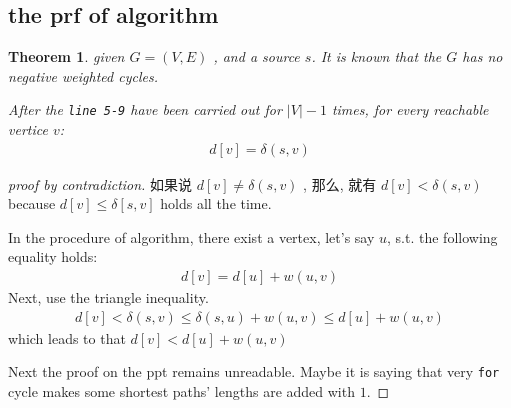\documentclass[a4paper, 10pt]{ctexart} %
\newtheorem{theorem}{Theorem}
\begin{document}
\subsection{the prf of algorithm}
\begin{theorem}
given $G = \left( V, E\right)$ , and a source $s$.
It is known that the $G$ has no 
negative weighted cycles.

After the \verb|line 5-9| have been 
carried out for $\left| V \right|  - 1$ 
times, for every reachable vertice $v$:
\begin{align*}
    d\left[ v \right] = \delta \left(s , v\right)
\end{align*}
\end{theorem}
\begin{proof}[proof by contradiction]
    如果说 $d\left[ v  \right] \ne \delta \left( s,  v\right)$ ,
    那么, 就有 $d\left[ v \right] < \delta \left(s ,v\right)$ because 
    $d [v] \le \delta  \left[ s, v   \right]$ 
    holds all the time.

    In the procedure of algorithm, there
    exist a vertex, let's say $u$, s.t. the following
    equality holds:
    \begin{align*}
        d[v] = d[u] + w\left(u,v\right)
    \end{align*}
    Next, use the triangle inequality.
    \begin{align*}
    d\left[ v \right] < \delta \left( s ,v\right) \le \delta \left( s,  u\right) + w \left( u, v\right) \le 
    d\left[ u  \right] + w\left( u ,v\right)
    \end{align*}
    which leads to that $d \left[ v  \right] < d\left[ u  \right] + w\left( u ,v\right)$

    Next the proof on the ppt remains unreadable. Maybe it is saying
    that very 
    \verb|for| cycle makes some shortest 
    paths' lengths are added with $1$.
\end{proof}
\end{document}
